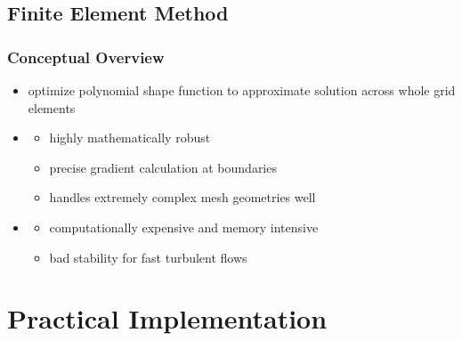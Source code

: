 	\subsection{Finite Element Method}

	\begin{frame}
		\frametitle{Conceptual Overview}
		\begin{itemize}
			\item<2->  optimize polynomial shape function to approximate solution across whole grid elements
			\item<3-> 
			\begin{itemize}
				\item<4-> highly mathematically robust
				\item<5-> precise gradient calculation at boundaries
				\item<6-> handles extremely complex mesh geometries well
			\end{itemize}
			\item<7-> 
			\begin{itemize}
				\item<8-> computationally expensive and memory intensive
				\item<9-> bad stability for fast turbulent flows
			\end{itemize}
		\end{itemize}
	\end{frame}

	\section{Practical Implementation}

